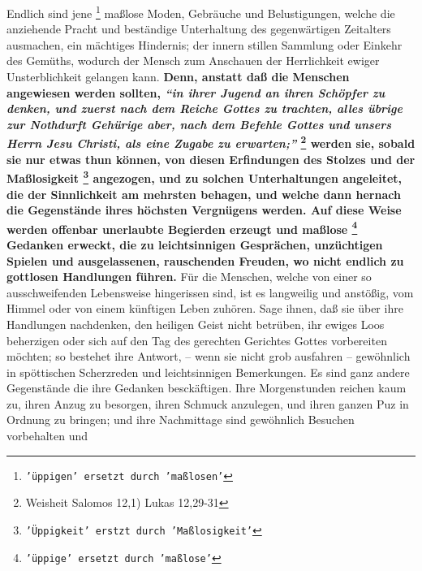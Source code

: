 Endlich sind jene \footnote{\texttt{'üppigen' ersetzt durch 'maßlosen'}}
maßlose Moden, Gebräuche und Belustigungen, welche die
anziehende Pracht und beständige Unterhaltung des gegenwärtigen Zeitalters
ausmachen, ein mächtiges Hindernis; der innern stillen Sammlung oder Einkehr des
Gemüths, wodurch der Mensch zum Anschauen der Herrlichkeit ewiger
Unsterblichkeit gelangen kann.
\textbf{Denn, anstatt daß die Menschen angewiesen werden
sollten,
\textit{"`in ihrer Jugend an ihren Schöpfer zu denken, und zuerst nach dem
Reiche Gottes zu trachten, alles übrige zur Nothdurft
Gehürige aber, nach dem
Befehle Gottes und unsers Herrn Jesu Christi, als eine Zugabe zu
erwarten;"'}
\footnote{Weisheit Salomos 12,1) Lukas  12,29-31}
werden sie, sobald sie nur
etwas thun können, von diesen Erfindungen des Stolzes und der Maßlosigkeit
\footnote{\texttt{'Üppigkeit' erstzt durch 'Maßlosigkeit'}}
angezogen, und zu solchen Unterhaltungen angeleitet, die der Sinnlichkeit am
mehrsten behagen, und welche dann hernach die Gegenstände ihres höchsten
Vergnügens werden. Auf diese Weise werden offenbar unerlaubte Begierden erzeugt
und maßlose
\footnote{\texttt{'üppige' ersetzt durch 'maßlose'}} Gedanken erweckt, die zu
leichtsinnigen Gesprächen, unzüchtigen
Spielen und ausgelassenen, rauschenden Freuden, wo nicht endlich zu gottlosen
Handlungen führen.} Für die Menschen, welche von einer so ausschweifenden
Lebensweise hingerissen sind, ist es langweilig und anstößig, vom Himmel oder
von einem künftigen Leben zuhören. Sage ihnen, daß sie über ihre Handlungen
nachdenken, den heiligen Geist nicht betrüben, ihr ewiges
Loos beherzigen oder
sich auf den Tag des gerechten Gerichtes Gottes
vorbereiten möchten; so bestehet
ihre Antwort, -- wenn sie nicht grob ausfahren -- gewöhnlich in spöttischen
Scherzreden und leichtsinnigen Bemerkungen. Es sind ganz andere Gegenstände die
ihre Gedanken besckäftigen. Ihre Morgenstunden reichen kaum zu, ihren Anzug zu
besorgen, ihren Schmuck anzulegen, und ihren ganzen Puz in Ordnung zu bringen;
und ihre Nachmittage sind gewöhnlich Besuchen vorbehalten und
